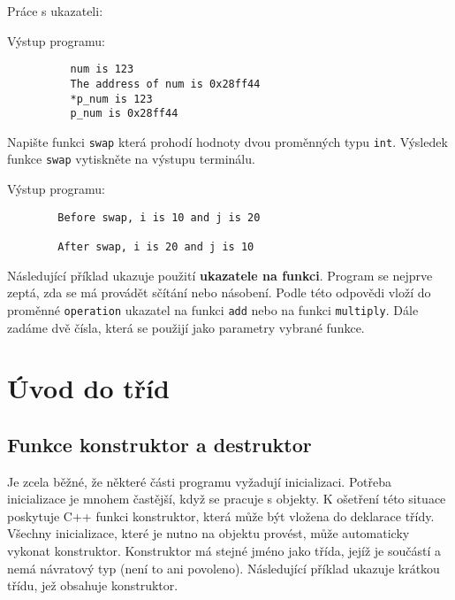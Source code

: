 {      \begin{example} Práce s ukazateli:\label{CPP:ex_pointer1}
      
      Výstup programu:
        \begin{verbatim}
          num is 123
          The address of num is 0x28ff44
          *p_num is 123
          p_num is 0x28ff44
          \end{verbatim}
      \end{example}
      
      \begin{example}\label{CPP:ex_swap} Napište funkci \texttt{swap} která prohodí hodnoty dvou 
      proměnných typu \texttt{int}. Výsledek funkce \texttt{swap} vytiskněte na výstupu terminálu.
      
      Výstup programu:
        \begin{verbatim}
        Before swap, i is 10 and j is 20
        
        After swap, i is 20 and j is 10
        \end{verbatim}
      \end{example}
      
      \begin{example}\label{CPP:ex_scitej_nasob} Následující příklad ukazuje použití 
      \textbf{ukazatele na funkci}. Program se nejprve zeptá, zda se má provádět sčítání nebo 
      násobení. Podle této odpovědi vloží do proměnné \texttt{operation} ukazatel na funkci 
      \texttt{add} nebo na funkci \texttt{multiply}. Dále zadáme dvě čísla, která se použijí jako 
      parametry vybrané funkce.
      
      \end{example}             
  
  \section{Úvod do tříd}
  
    \subsection{Funkce konstruktor a destruktor}
      Je zcela běžné, že některé části programu vyžadují inicializaci. Potřeba inicializace je 
      mnohem častější, když se pracuje s objekty. K ošetření této situace poskytuje C++ funkci 
      konstruktor, která může být vložena do deklarace třídy. Všechny inicializace, které je nutno 
      na objektu provést, může automaticky vykonat konstruktor. Konstruktor má stejné jméno jako 
      třída, jejíž je součástí a nemá návratový typ (není to ani povoleno). Následující příklad 
      ukazuje krátkou třídu, jež obsahuje konstruktor.
  
}
